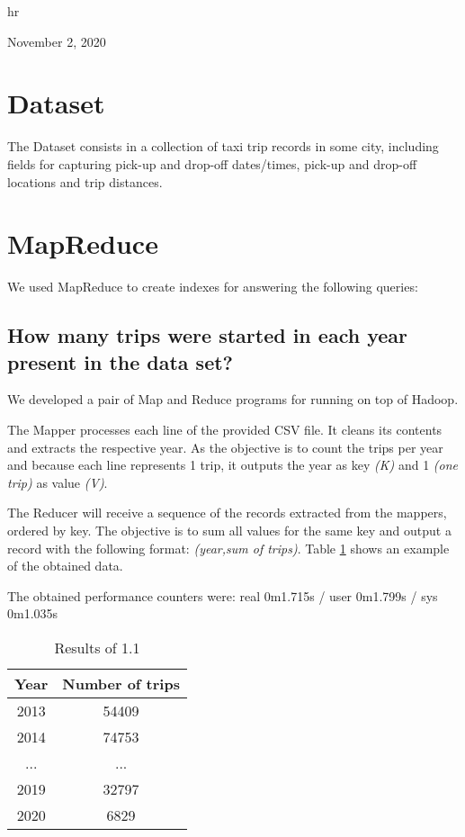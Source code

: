 \documentclass[conference,compsoc]{IEEEtran}
\begin{document}
\hfill hr

\hfill November 2, 2020




\section{Dataset}
The Dataset consists in a collection of taxi trip records in some city, including fields for capturing pick-up and drop-off dates/times, pick-up and drop-off locations and trip distances.

\section{MapReduce}
We used MapReduce to create indexes for answering the following queries:
\subsection{How many trips were started in each year present in the data set?}
We developed a pair of Map and Reduce programs for running on top of Hadoop. \par The Mapper processes each line of the provided CSV file. It cleans its contents and extracts the respective year. As the objective is to count the trips per year and because each line represents 1 trip, it outputs the year as key \textit{(K)} and 1 \textit{(one trip)} as value \textit{(V)}. \par The Reducer will receive a sequence of the records extracted from the mappers, ordered by key. The objective is to sum all values for the same key and output a record with the following format: \textit{(year,sum of trips)}. Table \ref{output_1_1} shows an example of the obtained data. \par The obtained performance counters were: real	0m1.715s / user	0m1.799s / sys	0m1.035s
\begin{table}[!t]
\renewcommand{\arraystretch}{1.3}
\caption{Results of 1.1}
\label{output_1_1}
\centering
\begin{tabular}{c||c}
\hline
\bfseries Year & \bfseries Number of trips\\
\hline\hline
2013 & 54409\\
2014 & 74753\\
... & ...\\
2019 & 32797\\
2020 & 6829 \\
\hline
\end{tabular}
\end{table}
\end{document}
